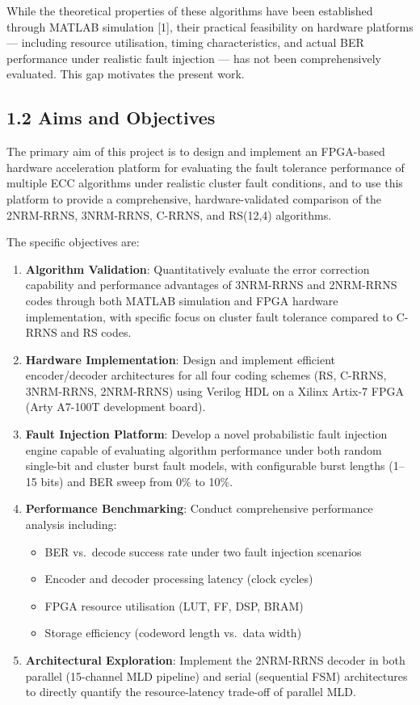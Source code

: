 While the theoretical properties of these algorithms have been
established through MATLAB simulation {[}1{]}, their practical
feasibility on hardware platforms --- including resource utilisation,
timing characteristics, and actual BER performance under realistic fault
injection --- has not been comprehensively evaluated. This gap motivates
the present work.

\subsection{1.2 Aims and Objectives}\label{aims-and-objectives}

The primary aim of this project is to design and implement an FPGA-based
hardware acceleration platform for evaluating the fault tolerance
performance of multiple ECC algorithms under realistic cluster fault
conditions, and to use this platform to provide a comprehensive,
hardware-validated comparison of the 2NRM-RRNS, 3NRM-RRNS, C-RRNS, and
RS(12,4) algorithms.

The specific objectives are:

\begin{enumerate}
\def\labelenumi{\arabic{enumi}.}
\tightlist
\item
  \textbf{Algorithm Validation}: Quantitatively evaluate the error
  correction capability and performance advantages of 3NRM-RRNS and
  2NRM-RRNS codes through both MATLAB simulation and FPGA hardware
  implementation, with specific focus on cluster fault tolerance
  compared to C-RRNS and RS codes.
\item
  \textbf{Hardware Implementation}: Design and implement efficient
  encoder/decoder architectures for all four coding schemes (RS, C-RRNS,
  3NRM-RRNS, 2NRM-RRNS) using Verilog HDL on a Xilinx Artix-7 FPGA (Arty
  A7-100T development board).
\item
  \textbf{Fault Injection Platform}: Develop a novel probabilistic fault
  injection engine capable of evaluating algorithm performance under
  both random single-bit and cluster burst fault models, with
  configurable burst lengths (1--15 bits) and BER sweep from 0\% to
  10\%.
\item
  \textbf{Performance Benchmarking}: Conduct comprehensive performance
  analysis including:

  \begin{itemize}
  \tightlist
  \item
    BER vs.~decode success rate under two fault injection scenarios
  \item
    Encoder and decoder processing latency (clock cycles)
  \item
    FPGA resource utilisation (LUT, FF, DSP, BRAM)
  \item
    Storage efficiency (codeword length vs.~data width)
  \end{itemize}
\item
  \textbf{Architectural Exploration}: Implement the 2NRM-RRNS decoder in
  both parallel (15-channel MLD pipeline) and serial (sequential FSM)
  architectures to directly quantify the resource-latency trade-off of
  parallel MLD.
\end{enumerate}

